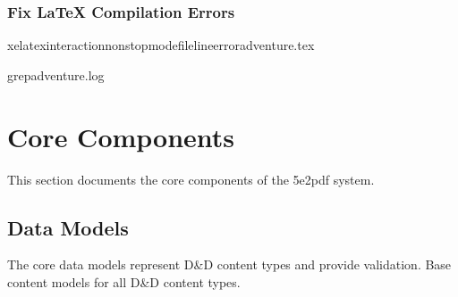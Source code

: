 \documentclass[letterpaper,10pt,english]{sphinxmanual}
\begin{document}
\subsubsection{Fix LaTeX Compilation Errors}
\label{\detokenize{user-guide/examples:fix-latex-compilation-errors}}
\begin{sphinxVerbatim}[commandchars=\\\{\}]
xelatex\PYGZhy{}interactionnonstopmode\PYGZhy{}file\PYGZhy{}line\PYGZhy{}erroradventure.tex

grepadventure.log
\end{sphinxVerbatim}

\sphinxstepscope


\section{Core Components}
\label{\detokenize{api/core:core-components}}\label{\detokenize{api/core::doc}}
\sphinxAtStartPar
This section documents the core components of the 5e2pdf system.


\subsection{Data Models}
\label{\detokenize{api/core:data-models}}
\sphinxAtStartPar
The core data models represent D\&D content types and provide validation.
\label{\detokenize{api/core:module-src.core.models.content}}
\sphinxAtStartPar
Base content models for all D\&D content types.
\end{document}
